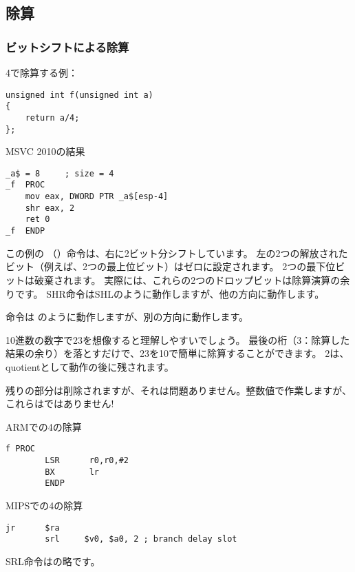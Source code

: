 ﻿\subsection{除算}

\subsubsection{ビットシフトによる除算}
\label{division_by_shifting}

4で除算する例：

\begin{lstlisting}[style=customc]
unsigned int f(unsigned int a)
{
	return a/4;
};
\end{lstlisting}

MSVC 2010の結果

\begin{lstlisting}[caption=MSVC 2010,style=customasmx86]
_a$ = 8		; size = 4
_f	PROC
	mov	eax, DWORD PTR _a$[esp-4]
	shr	eax, 2
	ret	0
_f	ENDP
\end{lstlisting}

\label{SHR}

この例の \SHR （）命令は、右に2ビット分シフトしています。 
左の2つの解放されたビット（例えば、2つの最上位ビット）はゼロに設定されます。
2つの最下位ビットは破棄されます。 
実際には、これらの2つのドロップビットは除算演算の余りです。
SHR命令はSHLのように動作しますが、他の方向に動作します。


\SHR 命令は \SHL のように動作しますが、別の方向に動作します。



10進数の数字で23を想像すると理解しやすいでしょう。
最後の桁（3：除算した結果の余り）を落とすだけで、23を10で簡単に除算することができます。
2は、\gls{quotient}として動作の後に残されます。

残りの部分は削除されますが、それは問題ありません。整数値で作業しますが、
これらはではありません!

ARMでの4の除算

\begin{lstlisting}[caption=\NonOptimizingKeilVI (\ARMMode),style=customasmARM]
f PROC
        LSR      r0,r0,#2
        BX       lr
        ENDP
\end{lstlisting}

MIPSでの4の除算

\begin{lstlisting}[caption=\Optimizing GCC 4.4.5 (IDA),style=customasmMIPS]
        jr      $ra
        srl     $v0, $a0, 2 ; branch delay slot
\end{lstlisting}

SRL命令はの略です。
